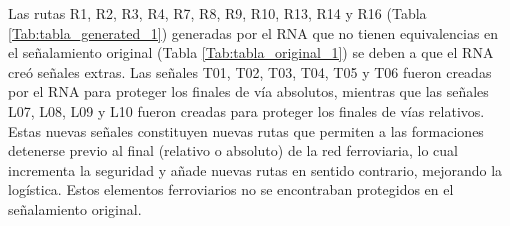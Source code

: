     Las rutas R1, R2, R3, R4, R7, R8, R9, R10, R13, R14 y R16 (Tabla \ref{Tab:tabla_generated_1}) generadas por el RNA que no tienen equivalencias en el señalamiento original (Tabla \ref{Tab:tabla_original_1}) se deben a que el RNA creó señales extras. Las señales T01, T02, T03, T04, T05 y T06 fueron creadas por el RNA para proteger los finales de vía absolutos, mientras que las señales L07, L08, L09 y L10 fueron creadas para proteger los finales de vías relativos. Estas nuevas señales constituyen nuevas rutas que permiten a las formaciones detenerse previo al final (relativo o absoluto) de la red ferroviaria, lo cual incrementa la seguridad y añade nuevas rutas en sentido contrario, mejorando la logística. Estos elementos ferroviarios no se encontraban protegidos en el señalamiento original.